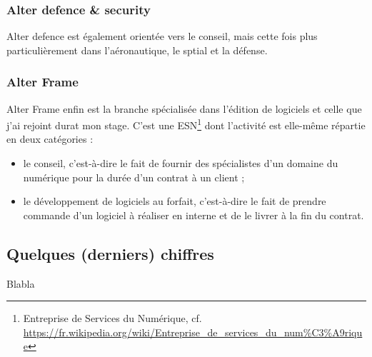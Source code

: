   \subsubsection{Alter defence \& security}
  Alter defence est également orientée vers le conseil, mais cette fois plus particulièrement dans l'aéronautique, le sptial et la défense.
  
  \subsubsection{Alter Frame}
  Alter Frame enfin est la branche spécialisée dans l'édition de logiciels et celle que j'ai rejoint durat mon stage. C'est une ESN\footnote{Entreprise de Services du Numérique, cf. \url{https://fr.wikipedia.org/wiki/Entreprise_de_services_du_num\%C3\%A9rique}} dont l'activité est elle-même répartie en deux catégories :
\begin{itemize}[label=$\bullet$]
    \item le conseil, c'est-à-dire le fait de fournir des spécialistes d'un domaine du numérique pour la durée d'un contrat à un client ;
    \item le développement de logiciels au forfait, c'est-à-dire le fait de prendre commande d'un logiciel à réaliser en interne et de le livrer à la fin du contrat.
    \end{itemize}

\subsection{Quelques (derniers) chiffres}
Blabla

   
